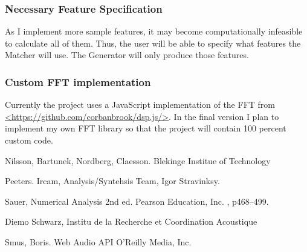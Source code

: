 \documentclass[DIV=calc, paper=a4, fontsize=11pt, twocolumn]{scrartcl}   %
\begin{document}
   \subsubsection{Necessary Feature Specification}
   As I implement more sample features, it may become computationally infeasible to calculate all of them. Thus, the user will be able to specify what features the Matcher will use. The Generator will only produce those features.
   \subsubsection{Custom FFT implementation}
   Currently the project uses a JavaScript implementation of the FFT from \url{<https://github.com/corbanbrook/dsp.js/>}. In the final version I plan to implement my own FFT library so that the project will contain 100 percent custom code.


\begin{thebibliography}{99} %


Nilsson, Bartunek, Nordberg, Claesson. Blekinge Institue of Technology

Peeters. Ircam, Analysis/Syntehsis Team, Igor Stravinksy.

Sauer, Numerical Analysis 2nd ed. Pearson Education, Inc.
, p468--499.

Diemo Schwarz, Institu de la Recherche et Coordination Acoustique

Smus, Boris. Web Audio API O'Reilly Media, Inc.


\end{thebibliography}

\end{document}
